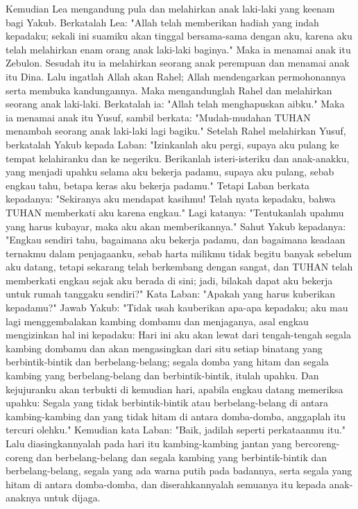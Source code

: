 \begin{biblechapter}
\verse Kemudian Lea mengandung pula dan melahirkan anak laki-laki yang keenam bagi Yakub.
\verse Berkatalah Lea: "Allah telah memberikan hadiah yang indah kepadaku; sekali ini suamiku akan tinggal bersama-sama dengan aku, karena aku telah melahirkan enam orang anak laki-laki baginya." Maka ia menamai anak itu Zebulon.
\verse Sesudah itu ia melahirkan seorang anak perempuan dan menamai anak itu Dina.
\verse Lalu ingatlah Allah akan Rahel; Allah mendengarkan permohonannya serta membuka kandungannya.
\verse Maka mengandunglah Rahel dan melahirkan seorang anak laki-laki. Berkatalah ia: "Allah telah menghapuskan aibku."
\verse Maka ia menamai anak itu Yusuf, sambil berkata: "Mudah-mudahan TUHAN menambah seorang anak laki-laki lagi bagiku."
 Setelah Rahel melahirkan Yusuf, berkatalah Yakub kepada Laban: "Izinkanlah aku pergi, supaya aku pulang ke tempat kelahiranku dan ke negeriku.
\verse Berikanlah isteri-isteriku dan anak-anakku, yang menjadi upahku selama aku bekerja padamu, supaya aku pulang, sebab engkau tahu, betapa keras aku bekerja padamu."
\verse Tetapi Laban berkata kepadanya: "Sekiranya aku mendapat kasihmu! Telah nyata kepadaku, bahwa TUHAN memberkati aku karena engkau."
\verse Lagi katanya: "Tentukanlah upahmu yang harus kubayar, maka aku akan memberikannya."
\verse Sahut Yakub kepadanya: "Engkau sendiri tahu, bagaimana aku bekerja padamu, dan bagaimana keadaan ternakmu dalam penjagaanku,
\verse sebab harta milikmu tidak begitu banyak sebelum aku datang, tetapi sekarang telah berkembang dengan sangat, dan TUHAN telah memberkati engkau sejak aku berada di sini; jadi, bilakah dapat aku bekerja untuk rumah tanggaku sendiri?"
\verse Kata Laban: "Apakah yang harus kuberikan kepadamu?" Jawab Yakub: "Tidak usah kauberikan apa-apa kepadaku; aku mau lagi menggembalakan kambing dombamu dan menjaganya, asal engkau mengizinkan hal ini kepadaku:
\verse Hari ini aku akan lewat dari tengah-tengah segala kambing dombamu dan akan mengasingkan dari situ setiap binatang yang berbintik-bintik dan berbelang-belang; segala domba yang hitam dan segala kambing yang berbelang-belang dan berbintik-bintik, itulah upahku.
\verse Dan kejujuranku akan terbukti di kemudian hari, apabila engkau datang memeriksa upahku: Segala yang tidak berbintik-bintik atau berbelang-belang di antara kambing-kambing dan yang tidak hitam di antara domba-domba, anggaplah itu tercuri olehku."
\verse Kemudian kata Laban: "Baik, jadilah seperti perkataanmu itu."
\verse Lalu diasingkannyalah pada hari itu kambing-kambing jantan yang bercoreng-coreng dan berbelang-belang dan segala kambing yang berbintik-bintik dan berbelang-belang, segala yang ada warna putih pada badannya, serta segala yang hitam di antara domba-domba, dan diserahkannyalah semuanya itu kepada anak-anaknya untuk dijaga.

\end{biblechapter}
